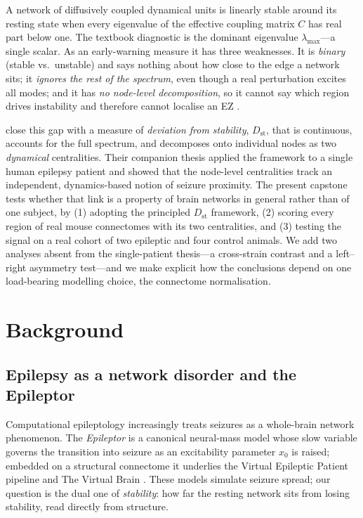\documentclass[11pt,a4paper]{article}
\newcommand{\Dst}{D_{\mathrm{st}}}
\begin{document}
A network of diffusively coupled dynamical units is linearly stable around its resting state when
every eigenvalue of the effective coupling matrix $C$ has real part below one. The textbook
diagnostic is the dominant eigenvalue $\lambda_{\max}$---a single scalar. As an early-warning
measure it has three weaknesses. It is \emph{binary} (stable vs.\ unstable) and says nothing about
how close to the edge a network sits; it \emph{ignores the rest of the spectrum}, even though a real
perturbation excites all modes; and it has \emph{no node-level decomposition}, so it cannot say which
region drives instability and therefore cannot localise an EZ \citep{liao_lizier2026}.

\citet{liao_lizier2026} close this gap with a measure of \emph{deviation from stability}, $\Dst$,
that is continuous, accounts for the full spectrum, and decomposes onto individual nodes as two
\emph{dynamical} centralities. Their companion thesis \citep{liao_thesis2026} applied the framework to
a single human epilepsy patient and showed that the node-level centralities track an independent,
dynamics-based notion of seizure proximity. The present capstone tests whether that link is a
property of brain networks in general rather than of one subject, by (1) adopting the principled
$\Dst$ framework, (2) scoring every region of real mouse connectomes with its two centralities, and
(3) testing the signal on a real cohort of two epileptic and four control animals. We add two
analyses absent from the single-patient thesis---a cross-strain contrast and a left--right
asymmetry test---and we make explicit how the conclusions depend on one load-bearing modelling
choice, the connectome normalisation.

\section{Background}

\subsection{Epilepsy as a network disorder and the Epileptor}
Computational epileptology increasingly treats seizures as a whole-brain network phenomenon. The
\emph{Epileptor} \citep{jirsa2014} is a canonical neural-mass model whose slow variable governs the
transition into seizure as an excitability parameter $x_0$ is raised; embedded on a structural
connectome it underlies the Virtual Epileptic Patient pipeline \citep{jirsa2017} and The Virtual
Brain \citep{sanzleon2013}. These models simulate seizure spread; our question is the dual one of
\emph{stability}: how far the resting network sits from losing stability, read directly from
structure.
\end{document}
